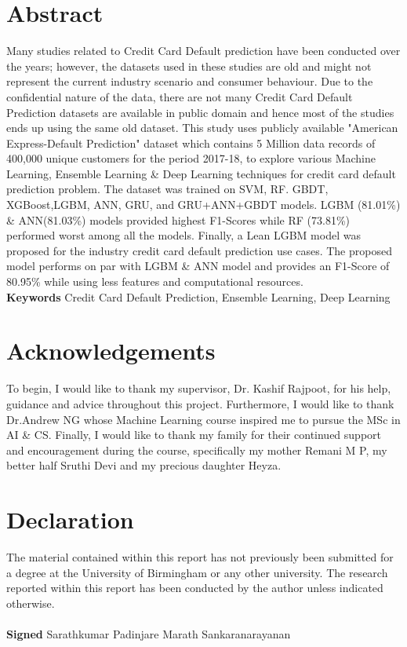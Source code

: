 \documentclass[twoside,11pt,a4paper]{article}
\begin{document}
\section*{\centering Abstract}	
Many studies related to Credit Card Default prediction have been conducted over the years; however, the datasets used in these studies are old and might not represent the current industry scenario and consumer behaviour. Due to the confidential nature of the data, there are not many Credit Card Default Prediction datasets are available in public domain and hence most of the studies ends up using the same old dataset. This study uses publicly available "American Express-Default Prediction" dataset which contains 5 Million data records of 400,000 unique customers for the period 2017-18, to explore various Machine Learning, Ensemble Learning \& Deep Learning techniques for credit card default prediction problem. The dataset was trained on \acf{SVM}, \acf{RF}. \acf{GBDT}, \acf{XGBoost},\acf{LGBM}, \acf{ANN}, \acf{GRU}, and \acs{GRU}+\acs{ANN}+\acs{GBDT} models. \acs{LGBM} (81.01\%) \& \acs{ANN}(81.03\%) models provided highest F1-Scores while \acs{RF} (73.81\%) performed worst among all the models. Finally, a Lean \acs{LGBM} model was proposed for the industry  credit card default prediction use cases. The proposed model performs on par with \acs{LGBM} \& \acs{ANN} model and provides an F1-Score of 80.95\% while using less features and computational resources.\\



\textbf{Keywords} Credit Card Default Prediction, Ensemble Learning, Deep Learning

\vfill
\clearpage

\section*{\centering Acknowledgements}
To begin, I would like to thank my supervisor, Dr. Kashif Rajpoot, for his help, guidance and
advice throughout this project. Furthermore, I would like to thank Dr.Andrew NG whose Machine Learning course inspired me to pursue the MSc in AI \& CS.
Finally, I would like to thank my family for their continued support and encouragement during the course, specifically my mother Remani M P, my better half Sruthi Devi and my precious daughter Heyza.

\vfill
\clearpage
\section*{\centering Declaration}
The material contained within this report has not previously been
submitted for a degree at the University of Birmingham or any other university.
The research reported within this report has been conducted by the author
unless indicated otherwise.\\
\\
\textbf{Signed} Sarathkumar Padinjare Marath Sankaranarayanan 
\end{document}
